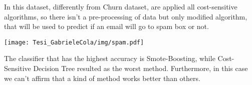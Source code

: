In this dataset, differently from Churn dataset, are applied all cost-sensitive algorithms, so there isn't a pre-processing of data but only modified algorithm, that will be used to predict if an email
will go to spam box or not.\noindent \\

\begin{center}
\texttt{[image: Tesi\_GabrieleCola/img/spam.pdf]}
\end{center}

The classifier that has the highest accuracy is Smote-Boosting, while Cost-Sensitive Decision Tree resulted as the worst method.
Furthermore, in this case we can't affirm that a kind of method works better than others.


    
    



